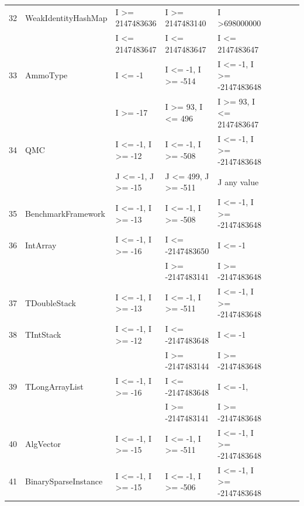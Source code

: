 \begin{table}[h]
{{\begin{tabular}{|l|l|l|l|l|l|l|l|l|}
32	& WeakIdentityHashMap		& I \textgreater= 2147483636				& I \textgreater= 2147483140			& I \textgreater 698000000					\\ 
	&                                             & I \textless= 2147483647					& I \textless= 2147483647				& I \textless= 2147483647					\\
33	& AmmoType				& I \textless= -1								& I \textless= -1, I \textgreater= -514		& I \textless= -1, I \textgreater= -2147483648	\\ 			
	&                                             & I \textgreater= -17							& I \textgreater= 93, I \textless= 496		& I \textgreater= 93, 	I \textless= 2147483647	\\
34	& QMC						& I \textless= -1, I \textgreater= -12			& I \textless= -1, I \textgreater= -508		& I \textless= -1, I \textgreater= -2147483648	\\ 
	&                                             & J \textless= -1, J \textgreater= -15			& J \textless= 499, J \textgreater= -511	& J any value			 		  				\\	
35	& BenchmarkFramework		& I \textless= -1, I \textgreater= -13			& I \textless= -1, I \textgreater= -508		& I \textless= -1, I \textgreater= -2147483648	\\ 
36	& IntArray					& I \textless= -1, I \textgreater= -16			& I \textless= -2147483650				& I \textless= -1								\\ 
	&							&											& I \textgreater= -2147483141			&  I \textgreater= -2147483648				\\
37	& TDoubleStack				& I \textless= -1, I \textgreater= -13			& I \textless= -1, I \textgreater= -511		& I \textless= -1, I \textgreater= -2147483648	\\ 
38	& TIntStack					& I \textless= -1, I \textgreater= -12			& I \textless= -2147483648		 		& I \textless= -1 							\\ 
	&							&											& I \textgreater= -2147483144			& I \textgreater= -2147483648				\\
39	& TLongArrayList				& I \textless= -1, I \textgreater= -16			& I \textless= -2147483648 				& I \textless= -1, 							\\ 
	&							&											& I \textgreater= -2147483141			& I \textgreater= -2147483648				\\
40	& AlgVector					& I \textless= -1, I \textgreater= -15			& I \textless= -1, I \textgreater= -511		& I \textless= -1, I \textgreater= -2147483648	\\ 
41	& BinarySparseInstance		& I \textless= -1, I \textgreater= -15			& I \textless= -1, I \textgreater= -506		& I \textless= -1, I \textgreater= -2147483648	\\ 

\end{tabular}}}
\end{table}
